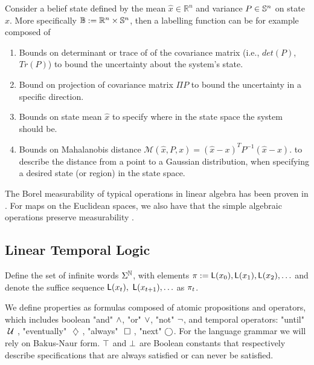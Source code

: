 \documentclass{ifacconf}
\begin{document}
     
     Consider a belief state defined by the mean $\hat x\in \mathbb R^n $ and variance $P\in \S^n$ on state $x$. More specifically $\mathbb B:=\mathbb R^n\times \S^n$,  then a labelling function  can be for example composed of %
     \begin{enumerate}
 	\item Bounds on determinant or trace of of the covariance matrix (i.e., $det(P)$, $Tr(P)$) to  bound the uncertainty about the system's state.
 	\item Bound on projection of covariance matrix $\Pi P$ to bound the uncertainty in a specific direction.
   \item   Bounds on state mean $\hat{x}$ to specify
    where in the state space the system should be. 
    \item Bounds on Mahalanobis distance $\mathcal{M}(\hat{x},P,x) = (\hat{x}-x)^TP^{-1}(\hat{x}-x)$.
    to describe the distance from a point to a Gaussian distribution, when specifying a desired state (or region) in the state space. 
    \end{enumerate}
 
    The Borel measurability of typical operations in linear algebra has been proven in \citep{azoff1974borel}.
For maps on the Euclidean spaces, we also have that the simple algebraic operations  preserve measurability \citep[page 116]{lang1993real}.
 
  
    \subsection{Linear Temporal Logic}
    
    Define the set of infinite
    words $\alphabeth^{\mathbb N}$,  with elements 
$\word:=\Lab(x_0),\Lab(x_1),\Lab(x_2), \ldots$ and denote the suffice sequence  $\Lab(x_t),$ $\Lab(x_{t+1}), \ldots$ as $\word_t$.

   
 We define properties as formulas composed of atomic propositions and operators, which includes boolean "and" $\andltl$, "or" $\orltl$, "not" $\notltl$, and temporal operators: "until" $\Until$, "eventually" $\Event$, "always" $\Always$, "next" $\Next$.
      For the language grammar we will rely on Bakus-Naur form. $\True$ and $\False$ are Boolean constants that respectively describe specifications that are always satisfied or can never be satisfied.
    
\end{document}
